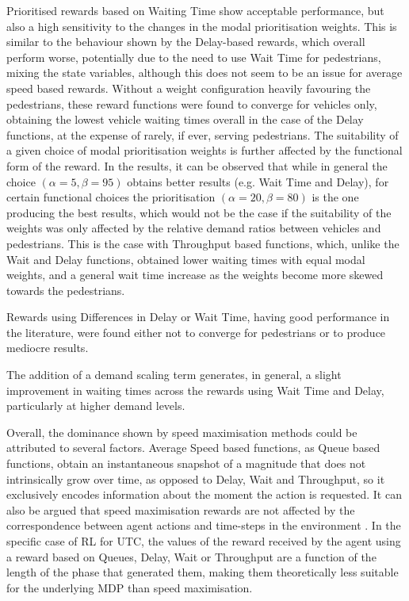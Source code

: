 \documentclass[sigconf,anonymous]{aamas}
\begin{document}
Prioritised rewards based on Waiting Time show acceptable performance, but also a high sensitivity to the changes in the modal prioritisation weights. 
This is similar to the behaviour shown by the Delay-based rewards, which overall perform worse, potentially due to the need to use Wait Time for pedestrians, mixing the state variables, although this does not seem to be an issue for average speed based rewards.
Without a weight configuration heavily favouring the pedestrians, these reward functions were found to converge for vehicles only, obtaining the lowest vehicle waiting times overall in the case of the Delay functions, at the expense of rarely, if ever, serving pedestrians.
The suitability of a given choice of modal prioritisation weights is further affected by the functional form of the reward.
In the results, it can be observed that while in general the choice $(\alpha=5,\beta=95)$ obtains better results (e.g. Wait Time and Delay), for certain functional choices the prioritisation $(\alpha=20,\beta=80)$ is the one producing the best results, which would not be the case if the suitability of the weights was only affected by the relative demand ratios between vehicles and pedestrians. 
This is the case with Throughput based functions, which, unlike the Wait and Delay functions, obtained lower waiting times with equal modal weights, and a general wait time increase as the weights become more skewed towards the pedestrians.

Rewards using Differences in Delay or Wait Time, having good performance in the literature, were found either not to converge for pedestrians or to produce mediocre results.

The addition of a demand scaling term generates, in general, a slight improvement in waiting times across the rewards using Wait Time and Delay, particularly at higher demand levels. 

Overall, the dominance shown by speed maximisation methods could be attributed to several factors.
Average Speed based functions, as Queue based functions, obtain an instantaneous snapshot of a magnitude that does not intrinsically grow over time, as opposed to Delay, Wait and Throughput, so it exclusively encodes information about the moment the action is requested.
It can also be argued that speed maximisation rewards are not affected by the correspondence between agent actions and time-steps in the environment . In the specific case of RL for UTC, the values of the reward received by the agent using a reward based on Queues, Delay, Wait or Throughput are a function of the length of the phase that generated them, making them theoretically less suitable for the underlying MDP than speed maximisation.
\end{document}
